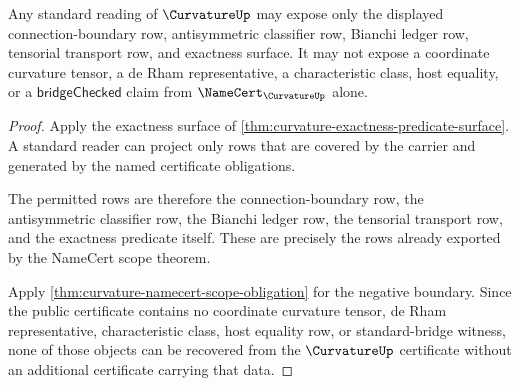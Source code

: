 \begin{theorem}
\label{thm:curvature-standard-bridge-boundary}
Any standard reading of $\CurvatureUp$ may expose only the displayed connection-boundary row, antisymmetric classifier row, Bianchi ledger row, tensorial transport row, and exactness surface. It may not expose a coordinate curvature tensor, a de Rham representative, a characteristic class, host equality, or a $\mathsf{bridgeChecked}$ claim from $\NameCert_{\CurvatureUp}$ alone.
\end{theorem}
\begin{proof}
Apply the exactness surface of \autoref{thm:curvature-exactness-predicate-surface}. A standard reader can project only rows that are covered by the carrier and generated by the named certificate obligations.

The permitted rows are therefore the connection-boundary row, the antisymmetric classifier row, the Bianchi ledger row, the tensorial transport row, and the exactness predicate itself. These are precisely the rows already exported by the NameCert scope theorem.

Apply \autoref{thm:curvature-namecert-scope-obligation} for the negative boundary. Since the public certificate contains no coordinate curvature tensor, de Rham representative, characteristic class, host equality row, or standard-bridge witness, none of those objects can be recovered from the $\CurvatureUp$ certificate without an additional certificate carrying that data.
\end{proof}

